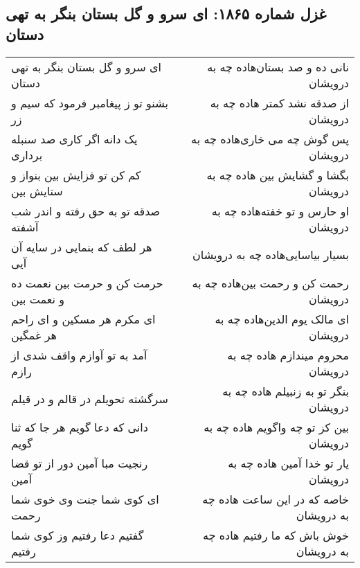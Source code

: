 \begin{center}
\section*{غزل شماره ۱۸۶۵: ای سرو و گل بستان بنگر به تهی دستان}
\label{sec:1865}
\begin{longtable}{l p{0.5cm} r}
ای سرو و گل بستان بنگر به تهی دستان
&&
نانی ده و صد بستان‌هاده چه به درویشان
\\
بشنو تو ز پیغامبر فرمود که سیم و زر
&&
از صدقه نشد کمتر هاده چه به درویشان
\\
یک دانه اگر کاری صد سنبله برداری
&&
پس گوش چه می خاری‌هاده چه به درویشان
\\
کم کن تو فزایش بین بنواز و ستایش بین
&&
بگشا و گشایش بین هاده چه به درویشان
\\
صدقه تو به حق رفته و اندر شب آشفته
&&
او حارس و تو خفته‌هاده چه به درویشان
\\
هر لطف که بنمایی در سایه آن آیی
&&
بسیار بیاسایی‌هاده چه به درویشان
\\
حرمت کن و حرمت بین نعمت ده و نعمت بین
&&
رحمت کن و رحمت بین‌هاده چه به درویشان
\\
ای مکرم هر مسکین و ای راحم هر غمگین
&&
ای مالک یوم الدین‌هاده چه به درویشان
\\
آمد به تو آوازم واقف شدی از رازم
&&
محروم میندازم هاده چه به درویشان
\\
سرگشته تحویلم در قالم و در قیلم
&&
بنگر تو به زنبیلم هاده چه به درویشان
\\
دانی که دعا گویم هر جا که ثنا گویم
&&
بین کز تو چه واگویم هاده چه به درویشان
\\
رنجیت مبا آمین دور از تو قضا آمین
&&
یار تو خدا آمین هاده چه به درویشان
\\
ای کوی شما جنت وی خوی شما رحمت
&&
خاصه که در این ساعت هاده چه به درویشان
\\
گفتیم دعا رفتیم وز کوی شما رفتیم
&&
خوش باش که ما رفتیم هاده چه به درویشان
\\
\end{longtable}
\end{center}
